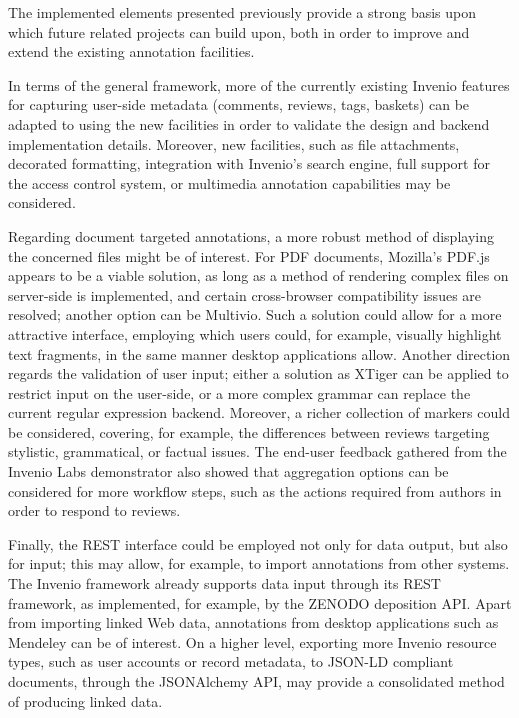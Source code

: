 
The implemented elements presented previously provide a strong basis upon which
future related projects can build upon, both in order to improve and extend the
existing annotation facilities.

In terms of the general framework, more of the currently existing Invenio
features for capturing user-side metadata (comments, reviews, tags, baskets)
can be adapted to using the new facilities in order to validate the design and
backend implementation details. Moreover, new facilities, such as file
attachments, decorated formatting, integration with Invenio's search engine,
full support for the access control system, or multimedia annotation
capabilities may be considered.

Regarding document targeted annotations, a more robust method of displaying the
concerned files might be of interest. For PDF documents, Mozilla's PDF.js
appears to be a viable solution, as long as a method of rendering complex files
on server-side is implemented, and certain cross-browser compatibility issues
are resolved; another option can be Multivio. Such a solution could allow for a
more attractive interface, employing which users could, for example, visually
highlight text fragments, in the same manner desktop applications allow.
Another direction regards the validation of user input; either a solution as
XTiger can be applied to restrict input on the user-side, or a more complex
grammar can replace the current regular expression backend. Moreover, a richer
collection of markers could be considered, covering, for example, the
differences between reviews targeting stylistic, grammatical, or factual
issues. The end-user feedback gathered from the Invenio Labs demonstrator also
showed that aggregation options can be considered for more workflow steps, such
as the actions required from authors in order to respond to reviews.

Finally, the REST  interface could be employed not only for data output, but
also for input; this may allow, for example, to import annotations from other
systems. The Invenio framework already supports data input through its REST
framework, as implemented, for example, by the ZENODO deposition API. Apart
from importing linked Web data, annotations from desktop applications such as
Mendeley can be of interest. On a higher level, exporting more Invenio resource
types, such as user accounts or record metadata, to JSON-LD compliant documents,
through the JSONAlchemy API, may provide a consolidated method of producing
linked data.
